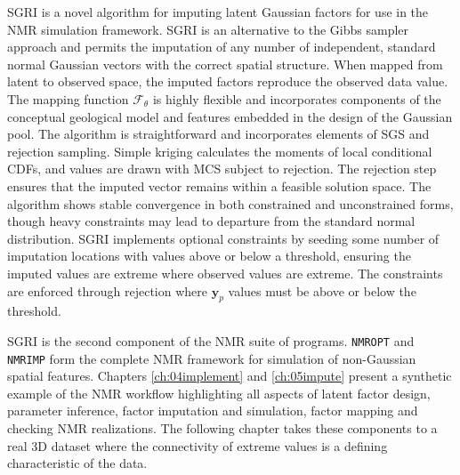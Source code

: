 \Gls{SGRI} is a novel algorithm for imputing latent Gaussian factors for use in the \gls{NMR} simulation framework. \Gls{SGRI} is an alternative to the Gibbs sampler approach and permits the imputation of any number of independent, standard normal Gaussian vectors with the correct spatial structure. When mapped from latent to observed space, the imputed factors reproduce the observed data value. The mapping function $\mathcal{F}_{\theta}$ is highly flexible and incorporates components of the conceptual geological model and features embedded in the design of the Gaussian pool. The algorithm is straightforward and incorporates elements of \gls{SGS} and rejection sampling. Simple kriging calculates the moments of local conditional \glspl{CDF}, and values are drawn with \gls{MCS} subject to rejection. The rejection step ensures that the imputed vector remains within a feasible solution space. The algorithm shows stable convergence in both constrained and unconstrained forms, though heavy constraints may lead to departure from the standard normal distribution. \Gls{SGRI} implements optional constraints by seeding some number of imputation locations with values above or below a threshold, ensuring the imputed values are extreme where observed values are extreme. The constraints are enforced through rejection where $\mathbf{y}_{p}$ values must be above or below the threshold.

\Gls{SGRI} is the second component of the \gls{NMR} suite of programs. \texttt{NMROPT} and \texttt{NMRIMP} form the complete \gls{NMR} framework for simulation of non-Gaussian spatial features. Chapters \ref{ch:04implement} and \ref{ch:05impute} present a synthetic example of the \gls{NMR} workflow highlighting all aspects of latent factor design, parameter inference, factor imputation and simulation, factor mapping and checking \gls{NMR} realizations. The following chapter takes these components to a real \gls{3D} dataset where the connectivity of extreme values is a defining characteristic of the data.